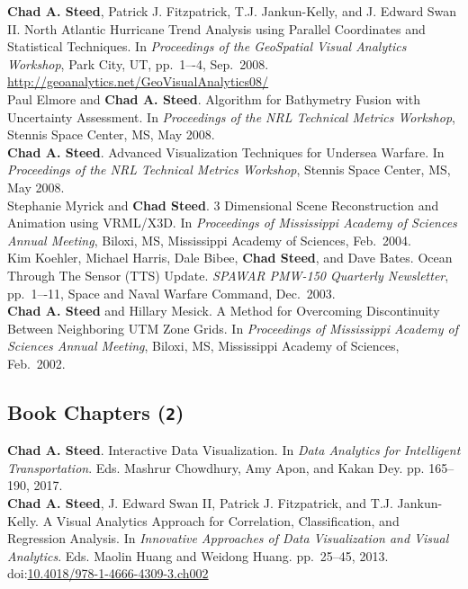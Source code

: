 \documentclass[11pt, letterpaper]{article}
\newcommand{\years}[1]{\marginnote{\scriptsize #1}}
\begin{document}
\begin{sloppypar}
\years{2009}\textbf{Chad A. Steed}, Patrick J. Fitzpatrick, T.J.
Jankun-Kelly, and J. Edward Swan II. North Atlantic Hurricane Trend Analysis
using Parallel Coordinates and Statistical Techniques.  In \emph{Proceedings of
the GeoSpatial Visual Analytics Workshop}, Park City, UT, pp.\ 1–-4, Sep.\ 2008.
\href{http://geoanalytics.net/GeoVisualAnalytics08/}
{http://geoanalytics.net/GeoVisualAnalytics08/}\\
\years{2008}Paul Elmore and \textbf{Chad A. Steed}.  Algorithm for Bathymetry
Fusion with Uncertainty Assessment.  In \emph{Proceedings of the NRL Technical
Metrics Workshop}, Stennis Space Center, MS, May 2008.\\
\years{2008}\textbf{Chad A. Steed}.  Advanced Visualization Techniques for
Undersea Warfare. In \emph{Proceedings of the NRL Technical Metrics Workshop},
Stennis Space Center, MS, May 2008. \\
\years{2004}Stephanie Myrick and \textbf{Chad Steed}. 3 Dimensional Scene
Reconstruction and Animation using VRML/X3D.  In \emph{Proceedings of
Mississippi Academy of Sciences Annual Meeting}, Biloxi, MS, Mississippi
Academy of Sciences, Feb.\ 2004.\\
\years{2003}Kim Koehler, Michael Harris, Dale Bibee, \textbf{Chad Steed},
and Dave Bates.  Ocean Through The Sensor (TTS) Update.  \emph{SPAWAR PMW-150
Quarterly Newsletter}, pp.\ 1–-11, Space and Naval Warfare Command, Dec.\ 2003.\\
\years{2002}\textbf{Chad A. Steed} and Hillary Mesick. A Method for Overcoming
Discontinuity Between Neighboring UTM Zone Grids.  In \emph{Proceedings of
Mississippi Academy of Sciences Annual Meeting}, Biloxi, MS, Mississippi
Academy of Sciences, Feb.\ 2002.
\end{sloppypar}

\subsection*{Book Chapters (\texttt{2})}
\noindent\years{2016}\textbf{Chad A. Steed}. Interactive Data Visualization.
In \emph{Data Analytics for Intelligent Transportation}. Eds. Mashrur
Chowdhury, Amy Apon, and Kakan Dey. pp. 165--190, 2017.\\
\years{2013}\textbf{Chad A. Steed}, J. Edward Swan II,
Patrick J. Fitzpatrick, and T.J. Jankun-Kelly.  A Visual Analytics Approach
for Correlation, Classification, and Regression Analysis. In \emph{Innovative Approaches
of Data Visualization and Visual Analytics}. Eds. Maolin Huang and Weidong Huang. pp.\ 25--45, 2013.
doi:\href{http://dx.doi.org/10.4018/978-1-4666-4309-3.ch002}{10.4018/978-1-4666-4309-3.ch002}
\end{document}
